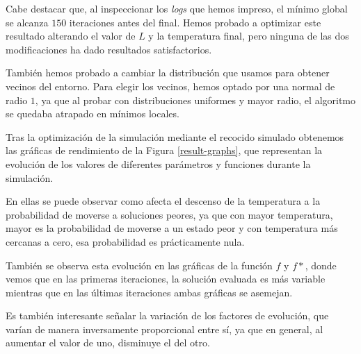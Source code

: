 \documentclass[a4paper,12pt]{article}
\begin{document}
	Cabe destacar que, al inspeccionar los \textit{logs} que hemos impreso, el mínimo global se alcanza $150$ iteraciones antes del final. Hemos probado a optimizar este resultado alterando el valor de $L$ y la temperatura final, pero ninguna de las dos modificaciones ha dado resultados satisfactorios. 
	
	También hemos probado a cambiar la distribución que usamos para obtener vecinos del entorno. Para elegir los vecinos, hemos optado por una normal de radio $1$, ya que al probar con distribuciones uniformes y mayor radio, el algoritmo se quedaba atrapado en mínimos locales.
	
	
	
	Tras la optimización de la simulación mediante el recocido simulado obtenemos las gráficas de rendimiento de la Figura \ref{result-graphs}, que representan la evolución de los valores de diferentes parámetros y funciones durante la simulación.
		
	En ellas se puede observar como afecta el descenso de la temperatura a la probabilidad de moverse a soluciones peores, ya que con mayor temperatura, mayor es la probabilidad de moverse a un estado peor y con temperatura más cercanas a cero, esa probabilidad es prácticamente nula.
	
	También se observa esta evolución en las gráficas de la función $f$ y $f*$, donde vemos que en las primeras iteraciones, la solución evaluada es más variable mientras que en las últimas iteraciones ambas gráficas se asemejan.
	
	Es también interesante señalar la variación de los factores de evolución, que varían de manera inversamente proporcional entre sí, ya que en general, al aumentar el valor de uno, disminuye el del otro.
	
\end{document}
